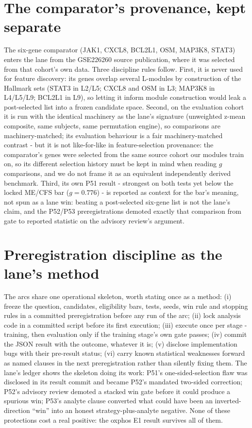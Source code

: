 \documentclass[11pt,a4paper]{article}
\begin{document}
\section{The comparator's provenance, kept separate}
The six-gene comparator (JAK1, CXCL8, BCL2L1, OSM, MAP3K8, STAT3) enters the
lane from the GSE226260 source publication, where it was selected from that
cohort's own data. Three discipline rules follow. First, it is never used for
feature discovery: its genes overlap several L-modules by construction of the
Hallmark sets (STAT3 in L2/L5; CXCL8 and OSM in L3; MAP3K8 in L4/L5/L9;
BCL2L1 in L9), so letting it inform module construction would leak a
post-selected list into a frozen candidate space. Second, on the evaluation
cohort it is run with the identical machinery as the lane's signature
(unweighted z-mean composite, same subjects, same permutation engine), so
comparisons are machinery-matched; its evaluation behaviour is a fair
machinery-matched contrast - but it is not like-for-like in
feature-selection provenance: the comparator's genes were selected from the
same source cohort our modules train on, so its different selection history
must be kept in mind when reading $g$ comparisons, and we do not frame it as
an equivalent independently derived benchmark. Third, its
own P51 result - strongest on both tests yet below the locked ME/CFS bar
($g=0.776$) - is reported as context for the bar's meaning, not spun as a
lane win: beating a post-selected six-gene list is not the lane's claim, and
the P52/P53 preregistrations demoted exactly that comparison from gate to
reported statistic on the advisory review's argument.

\section{Preregistration discipline as the lane's method}
The arcs share one operational skeleton, worth stating once as a method:
(i) freeze the question, candidates, eligibility bars, tests, seeds, win rule
and stopping rules in a committed preregistration before any run of the arc;
(ii) lock analysis code in a committed script before its first execution;
(iii) execute once per stage - training, then evaluation only if the training
stage's own gate passes; (iv) commit the JSON result with the outcome,
whatever it is; (v) disclose implementation bugs with their pre-result
status; (vi) carry known statistical weaknesses forward as named clauses in
the next preregistration rather than silently fixing them. The lane's ledger
shows the skeleton doing its work: P51's one-sided-selection flaw was
disclosed in its result commit and became P52's mandated two-sided
correction; P52's advisory review demoted a stacked win gate before it could
produce a spurious win; P53's analyte clause converted what could have been
an inverted-direction ``win'' into an honest strategy-plus-analyte negative.
None of these protections cost a real positive: the oxphos E1 result survives
all of them.
\end{document}
